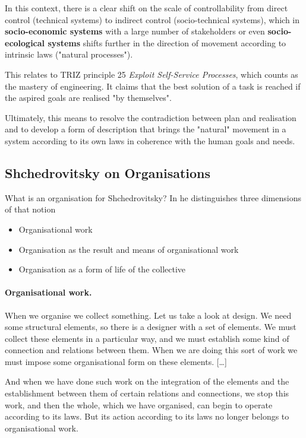 \documentclass[11pt,a4paper]{article}
\begin{document}
In this context, there is a clear shift on the scale of controllability from
direct control (technical systems) to indirect control (socio-technical
systems), which in \textbf{socio-economic systems} with a large number of
stakeholders or even \textbf{socio-ecological systems} shifts further in the
direction of movement according to intrinsic laws ("natural processes").

This relates to TRIZ principle 25 \emph{Exploit Self-Service Processes}, which
counts as the mastery of engineering.  It claims that the best solution of a
task is reached if the aspired goals are realised "by themselves".

Ultimately, this means to resolve the contradiction between plan and
realisation and to develop a form of description that brings the "natural"
movement in a system according to its own laws in coherence with the human
goals and needs.

\subsection{Shchedrovitsky on Organisations}

What is an organisation for Shchedrovitsky? In \cite[p. 30 ff]{MSM} he
distinguishes three dimensions of that notion
\begin{itemize}
\item Organisational work
\item Organisation as the result and means of organisational work
\item Organisation as a form of life of the collective
\end{itemize}

\paragraph{Organisational work.}
\cite[p. 26]{MSM} When we organise we collect something. Let us take a look at
design. We need some structural elements, so there is a designer with a set of
elements. We must collect these elements in a particular way, and we must
establish some kind of connection and relations between them. When we are
doing this sort of work we must impose some organisational form on these
elements. [\ldots]

And when we have done such work on the integration of the elements and the
establishment between them of certain relations and connections, we stop this
work, and then the whole, which we have organised, can begin to operate
according to its laws. But its action according to its laws no longer belongs
to organisational work.
\end{document}
